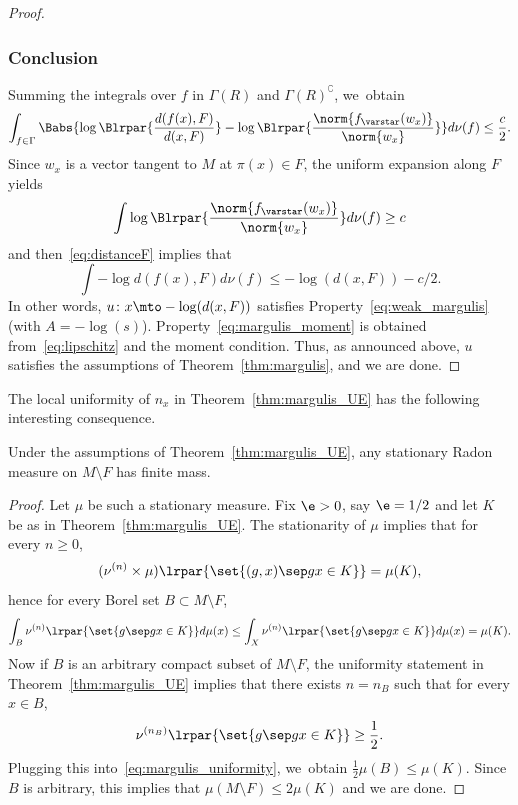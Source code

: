 \begin{proof}
\subsubsection*{Conclusion}
Summing the integrals over $f$ in $\Gamma(R)$ and $\Gamma(R)^\complement$, we~obtain
\begin{equation}\label{eq:distanceF}
\int_{f\in \Gamma} \Babs{\log\Blrpar{\frac{d(f(x),F)}{d(x, F)}} - \log\Blrpar{\frac{\norm{f_\varstar (w_x)}}{\norm{w_x}}}} d\nu(f) \leq \frac{c}{2}.
\end{equation}
Since $w_x$ is a vector tangent to $M$ at $\pi(x)\in F$,
the uniform expansion along $F$ yields
\begin{equation*}\int \log\Blrpar{\frac{\norm{f_\varstar (w_x)}}{\norm{w_x}}} d\nu(f) \geq c
\end{equation*}
and
then~\eqref{eq:distanceF} implies that
\begin{equation*}
\int - \log {d(f(x),F)} d\nu(f) \leq - \log(d(x, F)) - c/2.
\end{equation*}
In other words, $u\colon x\mto -\log(d(x,F))$ satisfies Property~\eqref{eq:weak_margulis} (with $A=-\log(s)$). Property~\eqref{eq:margulis_moment} is obtained from~\eqref{eq:lipschitz} and the moment condition.
Thus, as announced above, $u$ satisfies the assumptions of Theorem~\ref{thm:margulis}, and we are done. \end{proof}

The local uniformity of $n_x$ in Theorem~\ref{thm:margulis_UE} has the following interesting consequence.

\begin{pro}\label{pro:finite_mass}
Under the assumptions of Theorem~\ref{thm:margulis_UE}, any stationary Radon measure on $M\setminus F$ has finite mass.
\end{pro}

\begin{proof}
Let $\mu$ be such a stationary measure. Fix $\e>0$, say $\e =1/2$ and
let $K$ be as in Theorem~\ref{thm:margulis_UE}. The stationarity of $\mu$ implies that for every $n\geq 0$,
\begin{equation*}
(\nu^{(n)}\times\mu)\lrpar{ \set{(g, x)\sep gx \in K}} = \mu(K),
\end{equation*}
hence for every Borel set $B\subset M\setminus F$,
\begin{equation}\label{eq:margulis_uniformity}
\int_B \nu^{(n)}\lrpar{\set{g\sep gx\in K}} d\mu(x) \leq \int_X \nu^{(n)}\lrpar{\set{g\sep gx\in K}} d\mu(x) = \mu(K).
\end{equation}
Now if $B$ is an arbitrary compact subset of $M\setminus F$, the uniformity statement in
Theorem~\ref{thm:margulis_UE} implies that there exists $n = n_B$ such that
for every $x\in B$,
\begin{equation*}
\nu^{(n_B)}\lrpar{\set{g\sep gx\in K}}\geq \frac12.
\end{equation*}
Plugging this into~\eqref{eq:margulis_uniformity}, we~obtain $\frac12 \mu(B) \leq \mu(K)$.
Since $B$ is arbitrary, this implies that $\mu(M\setminus F)\leq 2\mu(K)$ and we are done.
\end{proof}

